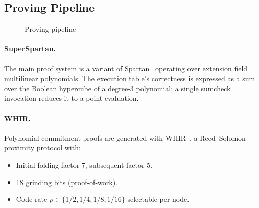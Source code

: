 \documentclass[11pt,a4paper]{article}
\begin{document}
\subsection{Proving Pipeline}
\label{subsec:proving}

\begin{figure}[H]
\centering
{}
\caption{Proving pipeline}
\label{fig:pipeline}
\end{figure}

\paragraph{SuperSpartan.}
The main proof system is a variant of Spartan~\cite{10.1007/978-3-030-56877-1_25} operating over extension field multilinear polynomials. The execution table's correctness is expressed as a sum over the Boolean hypercube of a degree-3 polynomial; a single sumcheck invocation reduces it to a point evaluation.

\paragraph{WHIR.}
Polynomial commitment proofs are generated with WHIR~\cite{10.1007/978-3-031-91134-7_8},
a Reed--Solomon proximity protocol with:
\begin{itemize}[noitemsep]
  \item Initial folding factor 7, subsequent factor 5.
  \item 18 grinding bits (proof-of-work).
  \item Code rate $\rho \in \{1/2, 1/4, 1/8, 1/16\}$ selectable per node.
\end{itemize}
\end{document}
